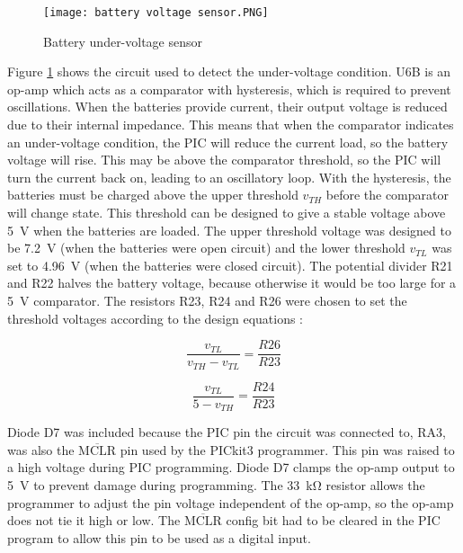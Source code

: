 \begin{figure}[htb]
	\centering
	\texttt{[image: battery voltage sensor.PNG]}
	\caption{Battery under-voltage sensor}
	\label{fig: battery voltage sensor}
\end{figure}

Figure \ref{fig: battery voltage sensor} shows the circuit used to detect the under-voltage condition. U6B is an op-amp which acts as a comparator with hysteresis, which is required to prevent oscillations. When the batteries provide current, their output voltage is reduced due to their internal impedance. This means that when the comparator indicates an under-voltage condition, the PIC will reduce the current load, so the battery voltage will rise. This may be above the comparator threshold, so the PIC will turn the current back on, leading to an oscillatory loop. With the hysteresis, the batteries must be charged above the upper threshold $v_{TH}$ before the comparator will change state. This threshold can be designed to give a stable voltage above \SI{5}{\volt} when the batteries are loaded. The upper threshold voltage was designed to be \SI{7.2}{\volt} (when the batteries were open circuit) and the lower threshold $v_{TL}$ was set to \SI{4.96}{\volt} (when the batteries were closed circuit). The potential divider R21 and R22 halves the battery voltage, because otherwise it would be too large for a \SI{5}{\volt} comparator. The resistors R23, R24 and R26 were chosen to set the threshold voltages according to the design equations \cite{hysteresis}:%
\begin{multicols}{2}
\begin{equation}
\frac{v_{TL}}{v_{TH} - v_{TL}} = \frac{R26}{R23}
\end{equation}

\begin{equation}
\frac{v_{TL}}{5 - v_{TH}} = \frac{R24}{R23}
\end{equation}
\end{multicols}

Diode D7 was included because the PIC pin the circuit was connected to, RA3, was also the $\overline{\text{MCLR}}$ pin used by the PICkit3 programmer. This pin was raised to a high voltage during PIC programming. Diode D7 clamps the op-amp output to \SI{5}{\volt} to prevent damage during programming. The \SI{33}{\kilo\ohm} resistor allows the programmer to adjust the pin voltage independent of the op-amp, so the op-amp does not tie it high or low. The $\overline{\text{MCLR}}$ config bit had to be cleared in the PIC program to allow this pin to be used as a digital input. \\

